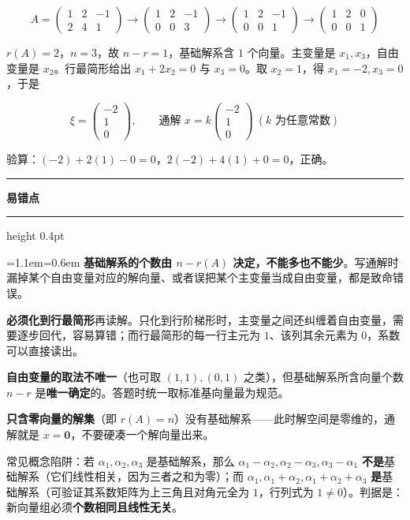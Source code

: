 \documentclass[11pt,openany,UTF8]{ctexbook}
\newcommand{\callouthead}[2]{%
  \par\addvspace{7pt}\noindent
  {\color{#1}\rule[-0.15em]{3pt}{1.05em}}\hspace{0.5em}%
  {\bfseries\color{#1}#2}\par\nobreak\vspace{-0.35em}%
  {\color{rulesep}\hrule height 0.4pt}\nobreak\vspace{0.45em}%
  \begingroup\small\setlength{\parindent}{0pt}%
  \leftskip=1.1em\rightskip=0.6em\noindent\ignorespaces}
\newcommand{\calloutend}{\par\endgroup\addvspace{7pt}}
\newenvironment{callwarn}[1]{\callouthead{warnbar}{#1}}{\calloutend}
\begin{document}
\[A=\begin{pmatrix} 1 & 2 & -1 \\ 2 & 4 & 1 \end{pmatrix}
\longrightarrow\begin{pmatrix} 1 & 2 & -1 \\ 0 & 0 & 3 \end{pmatrix}
\longrightarrow\begin{pmatrix} 1 & 2 & -1 \\ 0 & 0 & 1 \end{pmatrix}
\longrightarrow\begin{pmatrix} 1 & 2 & 0 \\ 0 & 0 & 1 \end{pmatrix}\]

$r(A)=2$，$n=3$，故 $n-r=1$，基础解系含 $1$ 个向量。主变量是 $x_1,x_3$，自由变量是 $x_2$。行最简形给出 $x_1+2x_2=0$ 与 $x_3=0$。取 $x_2=1$，得 $x_1=-2,x_3=0$，于是

\[\xi=\begin{pmatrix} -2 \\ 1 \\ 0 \end{pmatrix},\qquad
\text{通解 } x=k\begin{pmatrix} -2 \\ 1 \\ 0 \end{pmatrix}\ (k\text{ 为任意常数})\]

验算：$(-2)+2(1)-0=0$，$2(-2)+4(1)+0=0$，正确。

\begin{callwarn}{易错点}
\textbf{基础解系的个数由 $n-r(A)$ 决定，不能多也不能少}。写通解时漏掉某个自由变量对应的解向量、或者误把某个主变量当成自由变量，都是致命错误。

\textbf{必须化到行最简形}再读解。只化到行阶梯形时，主变量之间还纠缠着自由变量，需要逐步回代，容易算错；而行最简形的每一行主元为 $1$、该列其余元素为 $0$，系数可以直接读出。

\textbf{自由变量的取法不唯一}（也可取 $(1,1),(0,1)$ 之类），但基础解系所含向量个数 $n-r$ 是\textbf{唯一确定}的。答题时统一取标准基向量最为规范。

\textbf{只含零向量的解集}（即 $r(A)=n$）没有基础解系——此时解空间是零维的，通解就是 $x=\mathbf{0}$，不要硬凑一个解向量出来。

常见概念陷阱：若 $\alpha_1,\alpha_2,\alpha_3$ 是基础解系，那么 $\alpha_1-\alpha_2,\alpha_2-\alpha_3,\alpha_3-\alpha_1$ \textbf{不是}基础解系（它们线性相关，因为三者之和为零）；而 $\alpha_1,\alpha_1+\alpha_2,\alpha_1+\alpha_2+\alpha_3$ \textbf{是}基础解系（可验证其系数矩阵为上三角且对角元全为 $1$，行列式为 $1\ne0$）。判据是：新向量组必须\textbf{个数相同且线性无关}。

\end{callwarn}
\end{document}
